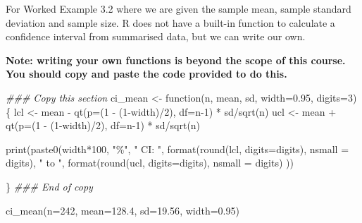 \documentclass[
  a4paper,
]{memoir}
\newenvironment{Shaded}{\begin{snugshade}}{\end{snugshade}}
\newcommand{\AttributeTok}[1]{\textcolor[rgb]{0.00,0.00,0.00}{#1}}
\newcommand{\ControlFlowTok}[1]{\textcolor[rgb]{0.00,0.00,0.00}{#1}}
\newcommand{\DecValTok}[1]{\textcolor[rgb]{0.00,0.00,0.00}{#1}}
\newcommand{\DocumentationTok}[1]{\textcolor[rgb]{0.00,0.00,0.00}{\textit{#1}}}
\newcommand{\FloatTok}[1]{\textcolor[rgb]{0.00,0.00,0.00}{#1}}
\newcommand{\FunctionTok}[1]{\textcolor[rgb]{0.00,0.00,0.00}{#1}}
\newcommand{\NormalTok}[1]{\textcolor[rgb]{0.00,0.00,0.00}{#1}}
\newcommand{\OtherTok}[1]{\textcolor[rgb]{0.00,0.00,0.00}{#1}}
\newcommand{\SpecialCharTok}[1]{\textcolor[rgb]{0.00,0.00,0.00}{#1}}
\newcommand{\StringTok}[1]{\textcolor[rgb]{0.00,0.00,0.00}{#1}}
\begin{document}
For Worked Example 3.2 where we are given the sample mean, sample
standard deviation and sample size. R does not have a built-in function
to calculate a confidence interval from summarised data, but we can
write our own.

\textbf{Note: writing your own functions is beyond the scope of this
course. You should copy and paste the code provided to do this.}

\begin{Shaded}
\begin{Highlighting}[]
\DocumentationTok{\#\#\# Copy this section}
\NormalTok{ci\_mean }\OtherTok{\textless{}{-}} \ControlFlowTok{function}\NormalTok{(n, mean, sd, }\AttributeTok{width=}\FloatTok{0.95}\NormalTok{, }\AttributeTok{digits=}\DecValTok{3}\NormalTok{)\{}
\NormalTok{  lcl }\OtherTok{\textless{}{-}}\NormalTok{ mean }\SpecialCharTok{{-}} \FunctionTok{qt}\NormalTok{(}\AttributeTok{p=}\NormalTok{(}\DecValTok{1} \SpecialCharTok{{-}}\NormalTok{ (}\DecValTok{1}\SpecialCharTok{{-}}\NormalTok{width)}\SpecialCharTok{/}\DecValTok{2}\NormalTok{), }\AttributeTok{df=}\NormalTok{n}\DecValTok{{-}1}\NormalTok{) }\SpecialCharTok{*}\NormalTok{ sd}\SpecialCharTok{/}\FunctionTok{sqrt}\NormalTok{(n)}
\NormalTok{  ucl }\OtherTok{\textless{}{-}}\NormalTok{ mean }\SpecialCharTok{+} \FunctionTok{qt}\NormalTok{(}\AttributeTok{p=}\NormalTok{(}\DecValTok{1} \SpecialCharTok{{-}}\NormalTok{ (}\DecValTok{1}\SpecialCharTok{{-}}\NormalTok{width)}\SpecialCharTok{/}\DecValTok{2}\NormalTok{), }\AttributeTok{df=}\NormalTok{n}\DecValTok{{-}1}\NormalTok{) }\SpecialCharTok{*}\NormalTok{ sd}\SpecialCharTok{/}\FunctionTok{sqrt}\NormalTok{(n)}
  
  \FunctionTok{print}\NormalTok{(}\FunctionTok{paste0}\NormalTok{(width}\SpecialCharTok{*}\DecValTok{100}\NormalTok{, }\StringTok{"\%"}\NormalTok{, }\StringTok{" CI: "}\NormalTok{, }\FunctionTok{format}\NormalTok{(}\FunctionTok{round}\NormalTok{(lcl, }\AttributeTok{digits=}\NormalTok{digits), }\AttributeTok{nsmall =}\NormalTok{ digits),}
               \StringTok{" to "}\NormalTok{, }\FunctionTok{format}\NormalTok{(}\FunctionTok{round}\NormalTok{(ucl, }\AttributeTok{digits=}\NormalTok{digits), }\AttributeTok{nsmall =}\NormalTok{ digits) ))}

\NormalTok{\}}
\DocumentationTok{\#\#\# End of copy}

\FunctionTok{ci\_mean}\NormalTok{(}\AttributeTok{n=}\DecValTok{242}\NormalTok{, }\AttributeTok{mean=}\FloatTok{128.4}\NormalTok{, }\AttributeTok{sd=}\FloatTok{19.56}\NormalTok{, }\AttributeTok{width=}\FloatTok{0.95}\NormalTok{)}
\end{Highlighting}
\end{Shaded}
\end{document}
